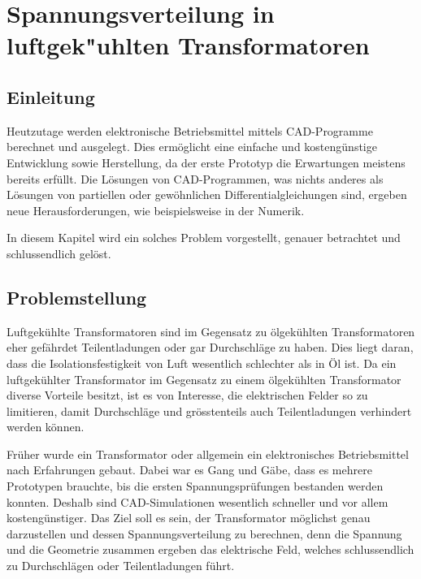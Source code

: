 \chapter{Spannungsverteilung in luftgek"uhlten Transformatoren\label{chapter:thema}}
\begin{refsection}

\section{Einleitung}

Heutzutage werden elektronische Betriebsmittel mittels CAD-Programme berechnet und ausgelegt. Dies ermöglicht eine einfache und kostengünstige Entwicklung sowie Herstellung, da der erste Prototyp die Erwartungen meistens bereits erfüllt. Die Lösungen von CAD-Programmen, was nichts anderes als Lösungen von partiellen oder gewöhnlichen Differentialgleichungen sind, ergeben neue Herausforderungen, wie beispielsweise in der Numerik. 

In diesem Kapitel wird ein solches Problem vorgestellt, genauer betrachtet und schlussendlich gelöst.

\section{Problemstellung}

Luftgekühlte Transformatoren sind im Gegensatz zu ölgekühlten Transformatoren eher gefährdet Teilentladungen oder gar Durchschläge zu haben. Dies liegt daran, dass die Isolationsfestigkeit von Luft wesentlich schlechter als in Öl ist. Da ein luftgekühlter Transformator im Gegensatz zu einem ölgekühlten Transformator diverse Vorteile besitzt, ist es von Interesse, die elektrischen Felder so zu limitieren, damit Durchschläge und grösstenteils auch Teilentladungen verhindert werden können. 

Früher wurde ein Transformator oder allgemein ein elektronisches Betriebsmittel nach Erfahrungen gebaut. Dabei war es Gang und Gäbe, dass es mehrere Prototypen brauchte, bis die ersten Spannungsprüfungen bestanden werden konnten. Deshalb sind CAD-Simulationen wesentlich schneller und vor allem kostengünstiger. Das Ziel soll es sein, der Transformator möglichst genau darzustellen und dessen Spannungsverteilung zu berechnen, denn die Spannung und die Geometrie zusammen ergeben das elektrische Feld, welches schlussendlich zu Durchschlägen oder Teilentladungen führt.


\end{refsection}
